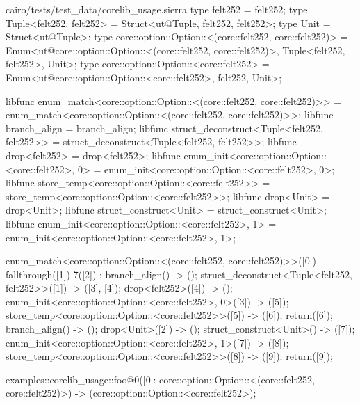 \documentclass[10pt]{amsart}
\begin{document}
\begin{code}{cairo/tests/test\_data/corelib\_usage.sierra}
type felt252 = felt252;
type Tuple<felt252, felt252> = Struct<ut@Tuple, felt252, felt252>;
type Unit = Struct<ut@Tuple>;
type core::option::Option::<(core::felt252, core::felt252)> = Enum<ut@core::option::Option::<(core::felt252, core::felt252)>, Tuple<felt252, felt252>, Unit>;
type core::option::Option::<core::felt252> = Enum<ut@core::option::Option::<core::felt252>, felt252, Unit>;

libfunc enum_match<core::option::Option::<(core::felt252, core::felt252)>> = enum_match<core::option::Option::<(core::felt252, core::felt252)>>;
libfunc branch_align = branch_align;
libfunc struct_deconstruct<Tuple<felt252, felt252>> = struct_deconstruct<Tuple<felt252, felt252>>;
libfunc drop<felt252> = drop<felt252>;
libfunc enum_init<core::option::Option::<core::felt252>, 0> = enum_init<core::option::Option::<core::felt252>, 0>;
libfunc store_temp<core::option::Option::<core::felt252>> = store_temp<core::option::Option::<core::felt252>>;
libfunc drop<Unit> = drop<Unit>;
libfunc struct_construct<Unit> = struct_construct<Unit>;
libfunc enum_init<core::option::Option::<core::felt252>, 1> = enum_init<core::option::Option::<core::felt252>, 1>;

enum_match<core::option::Option::<(core::felt252, core::felt252)>>([0]) { fallthrough([1]) 7([2]) };
branch_align() -> ();
struct_deconstruct<Tuple<felt252, felt252>>([1]) -> ([3], [4]);
drop<felt252>([4]) -> ();
enum_init<core::option::Option::<core::felt252>, 0>([3]) -> ([5]);
store_temp<core::option::Option::<core::felt252>>([5]) -> ([6]);
return([6]);
branch_align() -> ();
drop<Unit>([2]) -> ();
struct_construct<Unit>() -> ([7]);
enum_init<core::option::Option::<core::felt252>, 1>([7]) -> ([8]);
store_temp<core::option::Option::<core::felt252>>([8]) -> ([9]);
return([9]);

examples::corelib_usage::foo@0([0]: core::option::Option::<(core::felt252, core::felt252)>) -> (core::option::Option::<core::felt252>);
\end{code}
\end{document}
